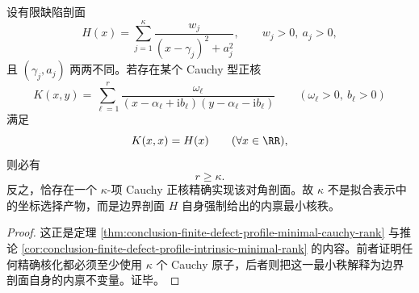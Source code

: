 \begin{theorem}\label{thm:conclusion-finite-defect-atomic-count-equals-intrinsic-minimal-cauchy-rank}
设有限缺陷剖面
\[
H(x)=\sum_{j=1}^{\kappa}\frac{w_j}{(x-\gamma_j)^2+a_j^2},
\qquad
w_j>0,\ a_j>0,
\]
且 \((\gamma_j,a_j)\) 两两不同。若存在某个 Cauchy 型正核
\[
K(x,y)=\sum_{\ell=1}^{r}
\frac{\omega_\ell}{(x-\alpha_\ell+\mathrm{i}b_\ell)(y-\alpha_\ell-\mathrm{i}b_\ell)}
\qquad
(\omega_\ell>0,\ b_\ell>0)
\]
满足
\[
K(x,x)=H(x)
\qquad(\forall x\in\RR),
\]
则必有
\[
r\ge \kappa.
\]
反之，恰存在一个 \(\kappa\)-项 Cauchy 正核精确实现该对角剖面。故 \(\kappa\) 不是拟合表示中的坐标选择产物，而是边界剖面 \(H\) 自身强制给出的内禀最小核秩。
\end{theorem}
\begin{proof}
这正是定理 \ref{thm:conclusion-finite-defect-profile-minimal-cauchy-rank} 与推论 \ref{cor:conclusion-finite-defect-profile-intrinsic-minimal-rank} 的内容。前者证明任何精确核化都必须至少使用 \(\kappa\) 个 Cauchy 原子，后者则把这一最小秩解释为边界剖面自身的内禀不变量。证毕。
\end{proof}

\endinput
